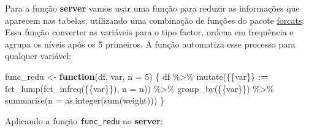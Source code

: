 \documentclass[
]{book}
\newenvironment{Shaded}{\begin{snugshade}}{\end{snugshade}}
\newcommand{\AttributeTok}[1]{\textcolor[rgb]{0.77,0.63,0.00}{#1}}
\newcommand{\ControlFlowTok}[1]{\textcolor[rgb]{0.13,0.29,0.53}{\textbf{#1}}}
\newcommand{\DecValTok}[1]{\textcolor[rgb]{0.00,0.00,0.81}{#1}}
\newcommand{\ErrorTok}[1]{\textcolor[rgb]{0.64,0.00,0.00}{\textbf{#1}}}
\newcommand{\FunctionTok}[1]{\textcolor[rgb]{0.00,0.00,0.00}{#1}}
\newcommand{\NormalTok}[1]{#1}
\newcommand{\OtherTok}[1]{\textcolor[rgb]{0.56,0.35,0.01}{#1}}
\newcommand{\SpecialCharTok}[1]{\textcolor[rgb]{0.00,0.00,0.00}{#1}}
\begin{document}
Para a função \textbf{server} vamos usar uma função para reduzir as informações que aparecem nas tabelas, utilizando uma combinação de funções do pacote \href{https://forcats.tidyverse.org/}{forcats}. Essa função converter as variáveis para o tipo factor, ordena em frequência e agrupa os níveis após os 5 primeiros. A função automatiza esse processo para qualquer variável:

\begin{Shaded}
\begin{Highlighting}[]
\NormalTok{func\_redu }\OtherTok{\textless{}{-}} \ControlFlowTok{function}\NormalTok{(df, var, }\AttributeTok{n =} \DecValTok{5}\NormalTok{) \{}
\NormalTok{  df }\SpecialCharTok{\%\textgreater{}\%}
    \FunctionTok{mutate}\NormalTok{(\{\{var\}\} }\SpecialCharTok{:}\ErrorTok{=} \FunctionTok{fct\_lump}\NormalTok{(}\FunctionTok{fct\_infreq}\NormalTok{(\{\{var\}\}), }\AttributeTok{n =}\NormalTok{ n)) }\SpecialCharTok{\%\textgreater{}\%}
    \FunctionTok{group\_by}\NormalTok{(\{\{var\}\}) }\SpecialCharTok{\%\textgreater{}\%}
    \FunctionTok{summarise}\NormalTok{(}\AttributeTok{n =} \FunctionTok{as.integer}\NormalTok{(}\FunctionTok{sum}\NormalTok{(weight)))}
\NormalTok{\}}
\end{Highlighting}
\end{Shaded}

Aplicando a função \texttt{func\_redu} no \textbf{server}:
\end{document}
